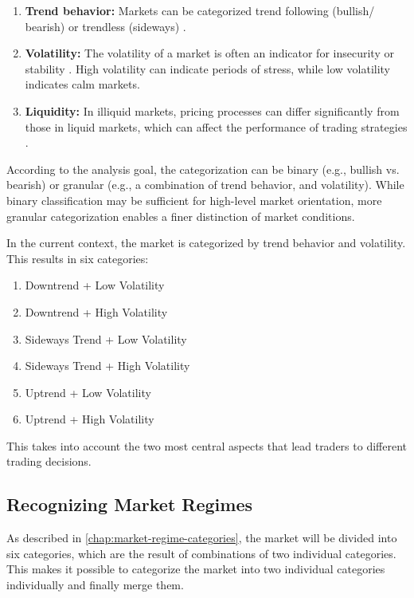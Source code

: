 \begin{enumerate}
    \item \textbf{Trend behavior:} Markets can be categorized trend following (bullish/ bearish) or trendless (sideways) \cite{regime-trend}.
    \item \textbf{Volatility:} The volatility of a market is often an indicator for insecurity or stability \cite{regime-vola}.
    High volatility can indicate periods of stress, while low volatility indicates calm markets.
    \item \textbf{Liquidity:} In illiquid markets, pricing processes can differ significantly from those in liquid markets, which can affect the performance of trading strategies \cite{regime-liq}.
\end{enumerate}

\noindent
According to the analysis goal, the categorization can be binary (e.g., bullish vs. bearish) or granular (e.g., a combination of trend behavior, and volatility).
While binary classification may be sufficient for high-level market orientation, more granular categorization enables a finer distinction of market conditions.

In the current context, the market is categorized by trend behavior and volatility.
This results in six categories:

\newpage
\begin{enumerate}
    \item Downtrend + Low Volatility
    \item Downtrend + High Volatility
    \item Sideways Trend + Low Volatility
    \item Sideways Trend + High Volatility
    \item Uptrend + Low Volatility
    \item Uptrend + High Volatility
\end{enumerate}

\noindent
This takes into account the two most central aspects that lead traders to different trading decisions.

\subsection{Recognizing Market Regimes}

As described in \autoref{chap:market-regime-categories}, the market will be divided into six categories, which are the result of combinations of two individual categories.
This makes it possible to categorize the market into two individual categories individually and finally merge them.

